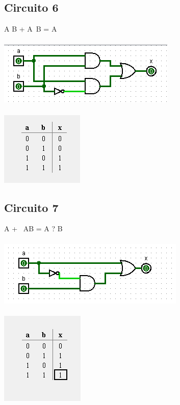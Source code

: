 \documentclass[12pt]{article}
\begin{document}
\subsection{Circuito 6}
A   B + A~B = A\\
\\\includegraphics{./images/circuito06.png}\\
\\\includegraphics{./images/circuito06_table.png}

\subsection{Circuito 7}
A + ~AB = A ? B\\
\\\includegraphics{./images/circuito07.png}\\
\\\includegraphics{./images/circuito07_table.png}
\end{document}
